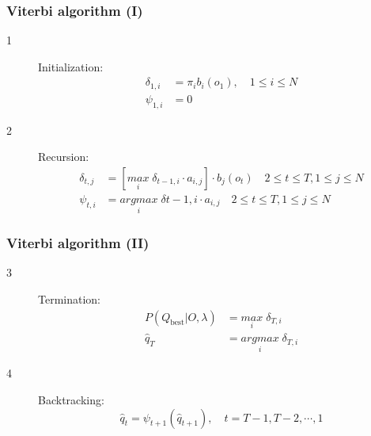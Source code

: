 \begin{frame}
  \frametitle{Viterbi algorithm (I)}
  \begin{description}
  \item[1] Initialization: \\
    \begin{equation}
      \label{eq:viterbi-initialization}
      \begin{split}
        \delta_{1,i} & = \pi_{i}b_i(o_1), \quad 1 \le i \le N \\
        \psi_{1,i} & = 0
      \end{split}
    \end{equation}
  \item[2] Recursion: \\
    \begin{equation}
      \label{eq:viterbi-recursion}
      \begin{split}
        \delta_{t,j} & = [\underset{i }{max}\; \delta_{t-1,i} \cdot
        a_{i,j}] \cdot b_{j}(o_{t})
        \quad \scriptstyle{2 \le t \le T, 1 \le j \le N} \\
        \psi_{t,i} & = \underset{i}{argmax}\; \delta{t-1,i}\cdot
        a_{i,j} \quad \scriptstyle{2 \le t \le T, 1 \le j \le N}
      \end{split}
    \end{equation}
  \end{description}
\end{frame}

\begin{frame}
  \frametitle{Viterbi algorithm (II)}
  \begin{description}
  \item[3] Termination: \\
    \begin{equation}
      \label{eq:viterbi-termination}
      \begin{split}
        P(Q_{\text{best}} \vert O, \lambda) & = \underset{i}{max}\; \delta_{T,i} \\
        \hat{q}_T & = \underset{i}{argmax}\; \delta_{T,i}
      \end{split}
    \end{equation}
  \item[4] Backtracking: \\
    \begin{equation}
      \label{eq:viterbi-backtracking}
      \hat{q}_t = \psi_{t+1}(\hat{q}_{t+1}), \quad \scriptstyle{t=T-1,T-2,\cdots, 1}
    \end{equation}
  \end{description}
\end{frame}

